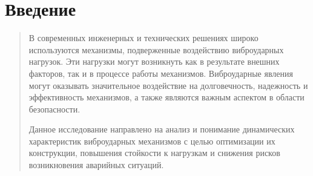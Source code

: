 \section{Введение}

\begin{quote}
В современных инженерных и технических решениях широко используются механизмы, подверженные воздействию виброударных нагрузок. Эти нагрузки могут возникнуть как в результате внешних факторов, так и в процессе работы механизмов. Виброударные явления могут оказывать значительное воздействие на долговечность, надежность и эффективность механизмов, а также являются важным аспектом в области безопасности.

Данное исследование направлено на анализ и понимание динамических характеристик виброударных механизмов с целью оптимизации их конструкции, повышения стойкости к нагрузкам и снижения рисков возникновения аварийных ситуаций.
\end{quote}
